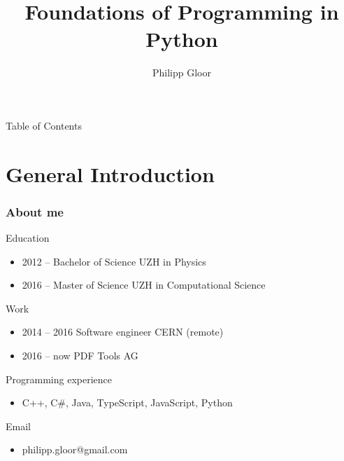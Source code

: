 \documentclass[10pt, a4paper]{beamer} %
\title %
{Foundations of Programming in Python}
\author %
{Philipp Gloor\inst{1}}
\institute
{
  \inst{1}%
  University of Zurich
}
\date{}
\begin{document}
\begin{frame}
\titlepage
\end{frame}

\begin{frame}{Table of Contents}
    \tableofcontents
\end{frame}

\section{General Introduction}
\begin{frame}
\frametitle{About me}

\begin{block}{Education}
    \begin{itemize}
        \item 2012 -- Bachelor of Science UZH in Physics
        \item 2016 -- Master of Science UZH in Computational Science
    \end{itemize}
\end{block}

\begin{block}{Work}
    \begin{itemize}
        \item 2014 -- 2016 Software engineer CERN (remote)
        \item 2016 -- now PDF Tools AG
    \end{itemize}
\end{block}

\begin{block}{Programming experience}
    \begin{itemize}
        \item[] C++, C\#, Java, TypeScript, JavaScript, Python
    \end{itemize}
\end{block}

\begin{block}{Email}
\begin{itemize}
    \item[] philipp.gloor@gmail.com
\end{itemize}
    
\end{block}
 
 
 
 
\end{frame}
\end{document}
